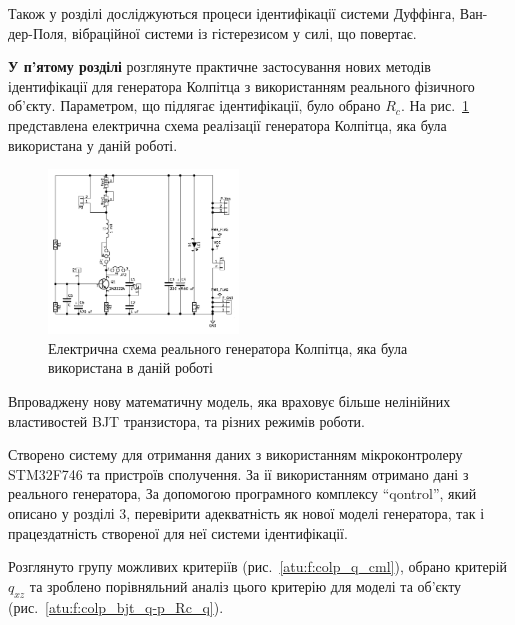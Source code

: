 \documentclass[a4paper,13pt]{atuaref}
\begin{document}
Також у розділі досліджуються процеси ідентифікації системи Дуффінга, Ван-дер-Поля,
вібраційної системи із гістерезисом у силі, що повертає.


\textbf{У п'ятому розділі}
розглянуте практичне застосування
нових методів ідентифікації для генератора Колпітца
з використанням реального фізичного об'єкту.
Параметром, що підлягає ідентифікації, було обрано $R_c$.
На рис.~\ref{atu:f:colp_schem_real} представлена електрична схема реалізації
генератора Колпітца, яка була використана у даній роботі.

\begin{figure}[htb!]
\centerline{\includegraphics[width=0.45\textwidth]{p6/p/colp_schem_real.png} }
\caption{Електрична схема реального генератора Колпітца, яка була використана в даній роботі}
\label{atu:f:colp_schem_real}
\end{figure}

Впроваджену нову математичну модель,
яка враховує більше нелінійних властивостей
BJT транзистора, та різних режимів роботи.


Створено систему для отримання даних з використанням мікроконтролеру STM32F746 та пристроїв сполучення.
За ії використанням отримано дані з реального
генератора, За допомогою програмного комплексу ``qontrol'',
який описано у розділі 3, перевірити адекватність як
нової моделі генератора,
так і працездатність створеної для неї системи ідентифікації.

Розглянуто групу можливих критеріїв (рис.~\ref{atu:f:colp_q_cml}),
обрано критерій $q_{xz}$
та зроблено порівняльний аналіз цього критерію
для моделі та об'єкту (рис.~\ref{atu:f:colp_bjt_q-p_Rc_q}).
\end{document}
